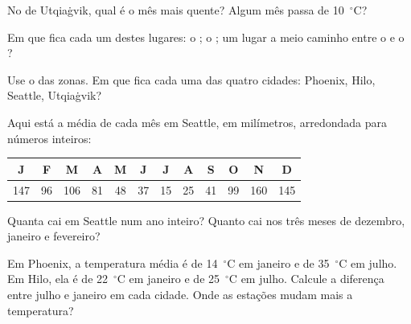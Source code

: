 \begin{exercise}[$\star$]\label{exo:g5:weather-and-climate:4}
No  de Utqiaġvik, qual é o mês mais quente? Algum mês passa de
10~$^\circ$C?
\end{exercise}

\begin{exercise}[$\star$]\label{exo:g5:weather-and-climate:5}
Em que  fica cada um destes lugares: o ; o ; um lugar a meio caminho entre o  e o ?
\end{exercise}

\begin{exercise}[$\star$]\label{exo:g5:weather-and-climate:6}
Use o  das zonas. Em que  fica cada uma das quatro
cidades: Phoenix, Hilo, Seattle, Utqiaġvik?
\end{exercise}

\begin{exercise}[$\star\star$]\label{exo:g5:weather-and-climate:7}
Aqui está a  média de cada mês em Seattle, em milímetros, arredondada
para números inteiros:
\begin{center}
\begin{tabular}{|*{12}{c|}}
\hline
J & F & M & A & M & J & J & A & S & O & N & D\\
\hline
147 & 96 & 106 & 81 & 48 & 37 & 15 & 25 & 41 & 99 & 160 & 145\\
\hline
\end{tabular}
\end{center}
Quanta  cai em Seattle num ano inteiro? Quanto cai nos três meses de
dezembro, janeiro e fevereiro?
\end{exercise}

\begin{exercise}[$\star\star$]\label{exo:g5:weather-and-climate:8}
Em Phoenix, a temperatura média é de 14~$^\circ$C em janeiro e de
35~$^\circ$C em julho. Em Hilo, ela é de 22~$^\circ$C em janeiro e de
25~$^\circ$C em julho. Calcule a diferença entre julho e janeiro em cada
cidade. Onde as estações mudam mais a temperatura?
\end{exercise}

